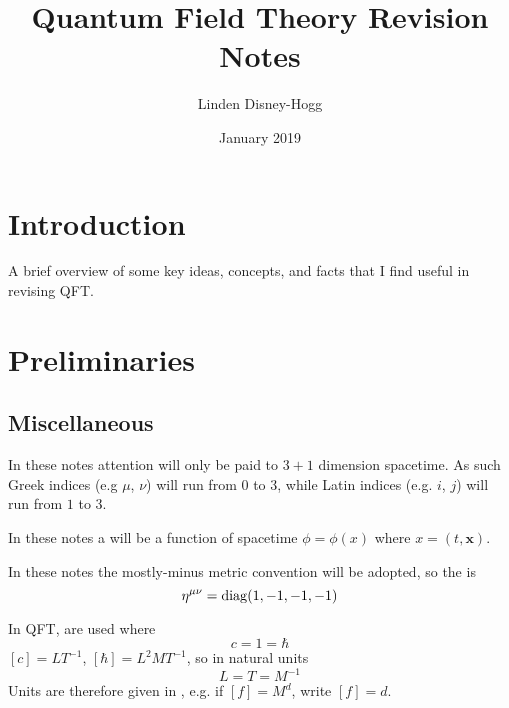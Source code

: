 \documentclass{article}
\title{Quantum Field Theory Revision Notes}
\author{Linden Disney-Hogg}
\date{January 2019}
\begin{document}
\maketitle
\tableofcontents

\section{Introduction}
A brief overview of some key ideas, concepts, and facts that I find useful in revising QFT. 

\section{Preliminaries}

\subsection{Miscellaneous}

\begin{definition}
In these notes attention will only be paid to $3+1$ dimension spacetime. As such Greek indices (e.g $\mu$, $\nu$) will run from $0$ to $3$, while Latin indices (e.g. $i$, $j$) will run from $1$ to $3$. 
\end{definition}

\begin{definition}[Field]
In these notes a  will be a function of spacetime $\phi=\phi(x)$ where $x=(t,\bm{x})$. 
\end{definition}

\begin{definition}
In these notes the mostly-minus metric convention will be adopted, so the  is 
\[
\eta^{\mu\nu}=\operatorname{diag}(1, -1, -1, -1)
\]
\end{definition}

\begin{definition}
In QFT,  are used where
\[
c=1=\hbar
\]
$[c]=LT^{-1}$, $[\hbar]=L^2 M T^{-1}$, so in natural units
\[
L=T=M^{-1}
\]
Units are therefore given in , e.g. if $[f]=M^d$, write $[f]=d$.
\end{definition}
\end{document}
